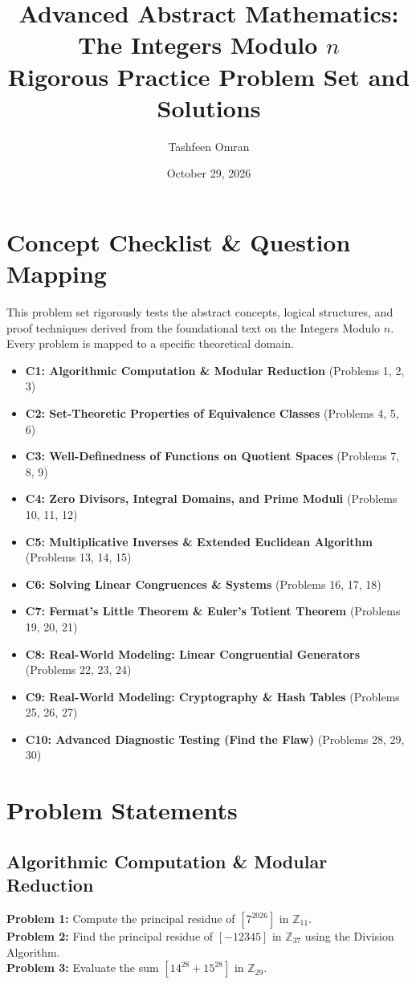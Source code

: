 \documentclass[11pt, a4paper]{article}
\title{Advanced Abstract Mathematics: The Integers Modulo $n$ \\ \large Rigorous Practice Problem Set and Solutions}
\author{Tashfeen Omran}
\date{October 29, 2026}
\theoremstyle{definition}
\theoremstyle{remark}
\newcommand{\Z}{\mathbb{Z}}
\begin{document}
\maketitle
\tableofcontents
\newpage

\section{Concept Checklist \& Question Mapping}
\label{sec:checklist_start}
This problem set rigorously tests the abstract concepts, logical structures, and proof techniques derived from the foundational text on the Integers Modulo $n$. Every problem is mapped to a specific theoretical domain.

\begin{itemize}
    \item \textbf{C1: Algorithmic Computation \& Modular Reduction} (Problems 1, 2, 3)
    \item \textbf{C2: Set-Theoretic Properties of Equivalence Classes} (Problems 4, 5, 6)
    \item \textbf{C3: Well-Definedness of Functions on Quotient Spaces} (Problems 7, 8, 9)
    \item \textbf{C4: Zero Divisors, Integral Domains, and Prime Moduli} (Problems 10, 11, 12)
    \item \textbf{C5: Multiplicative Inverses \& Extended Euclidean Algorithm} (Problems 13, 14, 15)
    \item \textbf{C6: Solving Linear Congruences \& Systems} (Problems 16, 17, 18)
    \item \textbf{C7: Fermat's Little Theorem \& Euler's Totient Theorem} (Problems 19, 20, 21)
    \item \textbf{C8: Real-World Modeling: Linear Congruential Generators} (Problems 22, 23, 24)
    \item \textbf{C9: Real-World Modeling: Cryptography \& Hash Tables} (Problems 25, 26, 27)
    \item \textbf{C10: Advanced Diagnostic Testing (Find the Flaw)} (Problems 28, 29, 30)
\end{itemize}

\newpage

\section{Problem Statements}

\subsection{Algorithmic Computation \& Modular Reduction}
\textbf{Problem 1:} Compute the principal residue of $[7^{2026}]$ in $\Z_{11}$. \\
\textbf{Problem 2:} Find the principal residue of $[-12345]$ in $\Z_{37}$ using the Division Algorithm. \\
\textbf{Problem 3:} Evaluate the sum $[14^{28} + 15^{28}]$ in $\Z_{29}$.
\end{document}
